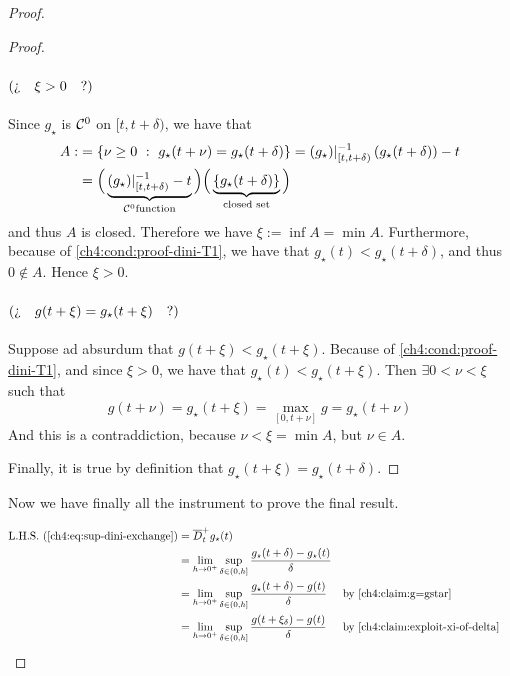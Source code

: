 \begin{proof}
\begin{proof}
	\paragraph{$(\logQuest{ \xi > 0 })$} Since $g_\star$ is $\Cspace^0$ on $[t,t+\delta)$, we have that
	\begin{align*}
		A :&= \left\{ \nu \geq 0 \ : \  g_\star(t + \nu) = g_\star (t + \delta) \right\} 
		= (g_\star)|_{[t,t+\delta)}^{-1} \left( g_\star (t + \delta) \right) - t
		\\
		&= \Big( 
		\underbrace{(g_\star)|_{[t,t+\delta)}^{-1} -t}_{\Cspace^0 \text{function}}
		\Big) 
		\Big( 
		\underbrace{\{g_\star (t + \delta) \} }_{\text{closed set}}
		\Big)
	\end{align*}
	and thus $A$ is closed.
	Therefore we have $\xi:= \inf A = \min A$.
	Furthermore, because of \ref{ch4:cond:proof-dini-T1}, we have that $g_\star(t) < g_\star (t + \delta)$, and thus $0 \notin A$.
	Hence $\xi > 0$.
	
	\paragraph{$(\logQuest{ g(t+\xi) = g_\star (t+ \xi) })$} Suppose ad absurdum that $g(t+\xi) < g_\star (t + \xi)$.
	Because of \ref{ch4:cond:proof-dini-T1}, and since $\xi > 0$, we have that $g_\star(t) < g_\star (t + \xi)$.
	Then $\exists 0 < \nu < \xi$ such that
	\begin{equation}
		g(t + \nu) = g_\star (t+ \xi) = \max_{[0, t+ \nu]} g = g_\star (t + \nu)
	\end{equation}
	And this is a contraddiction, because $\nu < \xi = \min A$, but $\nu \in A$.
	
	Finally, it is true by definition that $g_\star (t+ \xi)  = g_\star (t+ \delta)$.
\end{proof}
Now we have finally all the instrument to prove the final result.

	\begin{align*}
	\lhs(\ref{ch4:eq:sup-dini-exchange}) 
	&= \diniu^+_t g_\star(t) 
	\\
	&= \lim_{h \rightarrow 0^+} \sup_{\delta \in (0, h]} \frac{
		g_\star(t + \delta) - g_\star (t)
		}{\delta}
	\\
	&= \lim_{h \rightarrow 0^+} \sup_{\delta \in (0, h]} \frac{
		g_\star(t + \delta) - g (t)
	}{\delta}
	&& \text{by }\ref{ch4:claim:g=gstar}
	\\
	&= \lim_{h \rightarrow 0^+} \sup_{\delta \in (0, h]} \frac{
		g(t + \xi_\delta) - g (t)
	}{\delta}
	&& \text{by }\ref{ch4:claim:exploit-xi-of-delta}
	\end{align*}
	

\end{proof}
